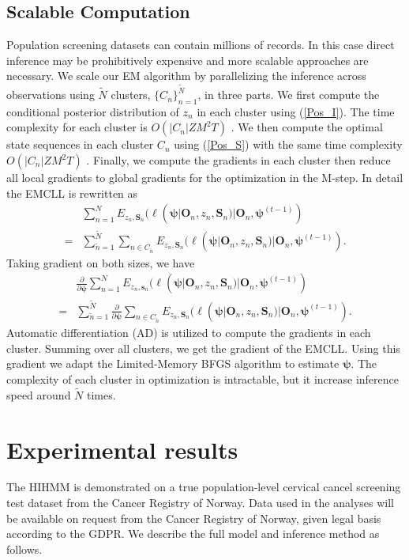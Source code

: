 \documentclass{article}
\begin{document}
\subsection{Scalable Computation}
Population screening datasets can contain millions of records.  In this case direct inference may be  prohibitively expensive and more scalable approaches are necessary. We scale our EM algorithm by parallelizing the inference across observations using $\tilde{N}$ clusters, $\{C_n\}_{n=1}^{\tilde{N}}$, in three parts. We first compute the conditional posterior distribution of $z_n$ in each cluster using (\ref{Pos_I}). The time complexity for each cluster is $O(|C_n|ZM^2T)$ \citep{KHREICH_2010}. We then compute the optimal state sequences in each cluster $C_n$ using (\ref{Pos_S}) with the same time complexity $O(|C_n|ZM^2T)$ \citep{Arturs_2016}. Finally, we compute the gradients in each cluster then reduce all local gradients to global gradients for the optimization in the M-step. In detail the EMCLL is rewritten as
\begin{eqnarray*}
	& \sum_{n=1}^{N}E_{z_n,\bm S_n}(\ell(\bm \psi| \bm O_n, z_n, \bm S_n)| \bm O_n, \bm \psi^{(t-1)}) \\ 
	= & \sum_{\tilde{n}=1}^{\tilde{N}}\sum_{n\in C_{\tilde{n}}}E_{z_n,\bm S_n}(\ell(\bm \psi| \bm O_n, z_n, \bm S_n)| \bm O_n, \bm \psi^{(t-1)}).
\end{eqnarray*} 
Taking gradient on both sizes, we have
\begin{eqnarray*}
	& \frac{\partial}{\partial \bm{\psi}}\sum_{n=1}^{N}E_{z_n,\bm s_n}(\ell(\bm \psi| \bm O_n, z_n, \bm S_n)| \bm O_n, \bm \psi^{(t-1)}) \\
	= & \sum_{\tilde{n}=1}^{\tilde{N}} \frac{\partial}{\partial \bm{\psi}}\sum_{n\in C_{\tilde{n}}}E_{z_n,\bm S_n}(\ell(\bm \psi| \bm O_n, z_n, \bm S_n)| \bm O_n, \bm \psi^{(t-1)}).
\end{eqnarray*}
Automatic differentiation (AD) \cite{Baydin_2018} is utilized to compute the gradients in each cluster. Summing over all clusters, we get the gradient of the EMCLL. Using this gradient we adapt the Limited-Memory BFGS \cite{Liu_1989} algorithm to estimate $\bm \psi$. The complexity of each cluster in optimization is intractable, but it increase inference speed around $\tilde{N}$ times.

\section{Experimental results}
The HIHMM is demonstrated on a true population-level cervical cancel screening test dataset from the Cancer Registry of Norway. Data used in the analyses will be available on request from the Cancer Registry of Norway, given legal basis according to the GDPR. We describe the full model and inference method as follows. 
\end{document}
